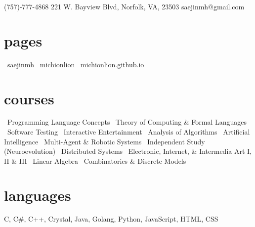 \documentclass[]{friggeri-cv}
\begin{document}
       {\faMobilePhone\hspace{1mm}(757)-777-4868 \hspace{1cm} 221 W. Bayview Blvd, Norfolk, VA, 23503 \hspace{1.5cm} \faEnvelope\hspace{1.5mm}saejinmh@gmail.com}

\begin{aside}
  \section{pages}\vspace{0.05cm}
    \href{https://www.linkedin.com/in/saejinmh}{\faLinkedin\ saejinmh}\vspace{0.03cm}
    \href{https://github.com/Michionlion}{\faGithub\ michionlion}\vspace{0.03cm}
    \href{https://michionlion.github.io}{\faGlobe\ michionlion.github.io}\vspace{0.03cm}
  \section{courses}\vspace{0.05cm}
  \bullet\ Programming Language Concepts\vspace{0.1cm}
  \bullet\ Theory of Computing \& Formal Languages\vspace{0.1cm}
  \bullet\ Software Testing\vspace{0.1cm}
  \bullet\ Interactive Entertainment\vspace{0.1cm}
  \bullet\ Analysis of Algorithms\vspace{0.1cm}
  \bullet\ Artificial Intelligence\vspace{0.1cm}
  \bullet\ Multi-Agent \& Robotic Systems\vspace{0.1cm}
  \bullet\ Independent Study (Neuroevolution)\vspace{0.1cm}
  \bullet\ Distributed Systems\vspace{0.1cm}
  \bullet\ Electronic, Internet, \& Intermedia Art I, II \& III\vspace{0.1cm}
  \bullet\ Linear Algebra\vspace{0.1cm}
  \bullet\ Combinatorics \& Discrete Models\vspace{0.1cm}
  \section{languages}\vspace{0.05cm}
    C, C\#, C++, Crystal, Java, Golang, Python, JavaScript, HTML, CSS\vspace{0.1cm}

\end{aside}
\end{document}
